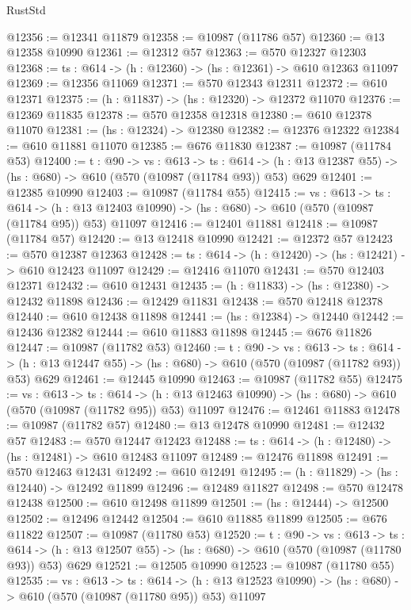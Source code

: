 \begin{lexlean}{RustStd}
\begin{coremodule}
@12356 := @12341 @11879
@12358 := @10987 (@11786 @57)
@12360 := @13 @12358 @10990
@12361 := @12312 @57
@12363 := @570 @12327 @12303
@12368 := {ts : @614} -> (h : @12360) -> (hs : @12361) -> @610 @12363 @11097
@12369 := @12356 @11069
@12371 := @570 @12343 @12311
@12372 := @610 @12371
@12375 := (h : @11837) -> (hs : @12320) -> @12372 @11070
@12376 := @12369 @11835
@12378 := @570 @12358 @12318
@12380 := @610 @12378 @11070
@12381 := (hs : @12324) -> @12380
@12382 := @12376 @12322
@12384 := @610 @11881 @11070
@12385 := @676 @11830
@12387 := @10987 (@11784 @53)
@12400 := {t : @90} ->
  {vs : @613} ->
  {ts : @614} -> (h : @13 @12387 @55) -> (hs : @680) -> @610 (@570 (@10987 (@11784 @93)) @53) @629
@12401 := @12385 @10990
@12403 := @10987 (@11784 @55)
@12415 := {vs : @613} ->
  {ts : @614} ->
  (h : @13 @12403 @10990) -> (hs : @680) -> @610 (@570 (@10987 (@11784 @95)) @53) @11097
@12416 := @12401 @11881
@12418 := @10987 (@11784 @57)
@12420 := @13 @12418 @10990
@12421 := @12372 @57
@12423 := @570 @12387 @12363
@12428 := {ts : @614} -> (h : @12420) -> (hs : @12421) -> @610 @12423 @11097
@12429 := @12416 @11070
@12431 := @570 @12403 @12371
@12432 := @610 @12431
@12435 := (h : @11833) -> (hs : @12380) -> @12432 @11898
@12436 := @12429 @11831
@12438 := @570 @12418 @12378
@12440 := @610 @12438 @11898
@12441 := (hs : @12384) -> @12440
@12442 := @12436 @12382
@12444 := @610 @11883 @11898
@12445 := @676 @11826
@12447 := @10987 (@11782 @53)
@12460 := {t : @90} ->
  {vs : @613} ->
  {ts : @614} -> (h : @13 @12447 @55) -> (hs : @680) -> @610 (@570 (@10987 (@11782 @93)) @53) @629
@12461 := @12445 @10990
@12463 := @10987 (@11782 @55)
@12475 := {vs : @613} ->
  {ts : @614} ->
  (h : @13 @12463 @10990) -> (hs : @680) -> @610 (@570 (@10987 (@11782 @95)) @53) @11097
@12476 := @12461 @11883
@12478 := @10987 (@11782 @57)
@12480 := @13 @12478 @10990
@12481 := @12432 @57
@12483 := @570 @12447 @12423
@12488 := {ts : @614} -> (h : @12480) -> (hs : @12481) -> @610 @12483 @11097
@12489 := @12476 @11898
@12491 := @570 @12463 @12431
@12492 := @610 @12491
@12495 := (h : @11829) -> (hs : @12440) -> @12492 @11899
@12496 := @12489 @11827
@12498 := @570 @12478 @12438
@12500 := @610 @12498 @11899
@12501 := (hs : @12444) -> @12500
@12502 := @12496 @12442
@12504 := @610 @11885 @11899
@12505 := @676 @11822
@12507 := @10987 (@11780 @53)
@12520 := {t : @90} ->
  {vs : @613} ->
  {ts : @614} -> (h : @13 @12507 @55) -> (hs : @680) -> @610 (@570 (@10987 (@11780 @93)) @53) @629
@12521 := @12505 @10990
@12523 := @10987 (@11780 @55)
@12535 := {vs : @613} ->
  {ts : @614} ->
  (h : @13 @12523 @10990) -> (hs : @680) -> @610 (@570 (@10987 (@11780 @95)) @53) @11097

\end{coremodule}
\end{lexlean}
